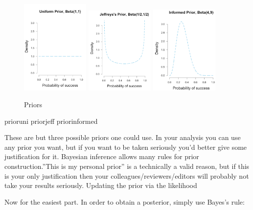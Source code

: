 \begin{figure}[h]
    \centering
\includegraphics[width=0.3\textwidth]{pic/p05c03-snip06-1.png}
\includegraphics[width=0.3\textwidth]{pic/p05c03-snip06-2.png}
\includegraphics[width=0.3\textwidth]{pic/p05c03-snip06-3.png}
    \caption{Priors}
    \label{fig:p05c03-snip06}
\end{figure}


prioruni priorjeff priorinformed

These are but three possible priors one could use. In your analysis you can use any prior you want, but if you want to be taken seriously you'd better give some justification for it. Bayesian inference allows many rules for prior construction.”This is my personal prior” is a technically a valid reason, but if this is your only justification then your colleagues/reviewers/editors will probably not take your results seriously.
Updating the prior via the likelihood

Now for the easiest part. In order to obtain a posterior, simply use Bayes's rule:

